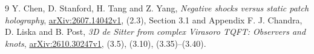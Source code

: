 \documentclass[11pt,a4paper]{article}
\begin{document}
\begin{thebibliography}{9}
 Y. Chen, D. Stanford, H. Tang and Z. Yang,
\emph{Negative shocks versus static patch holography},
\href{https://arxiv.org/abs/2607.14042v1}{arXiv:2607.14042v1},
(2.3), Section 3.1 and Appendix F.
 J. Chandra, D. Liska and B. Post,
\emph{3D de Sitter from complex Virasoro TQFT: Observers and knots},
\href{https://arxiv.org/abs/2610.30247v1}{arXiv:2610.30247v1},
(3.5), (3.10), (3.35)--(3.40).
\end{thebibliography}
\end{document}

